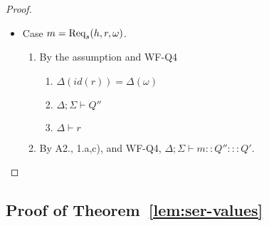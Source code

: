 \begin{proof}
\begin{itemize}
\item Case $m = {\textrm{Req}_s(h, r, \omega)}$.
\begin{enumerate}
\item By the assumption and WF-Q4
  \begin{enumerate}[label=(\alph*)]
  \item $\Delta(id(r)) = \Delta(\omega)$
  \item $\Delta ; \Sigma \vdash Q''$
  \item $\Delta \vdash r$
  \end{enumerate}
\item By A2., 1.a,c), and WF-Q4, $\Delta ; \Sigma \vdash m :: Q'' ::: Q'$.
\end{enumerate}
\end{itemize}
\end{proof}

\subsection{Proof of Theorem~\ref{lem:ser-values}}\label{app:ser-values}

